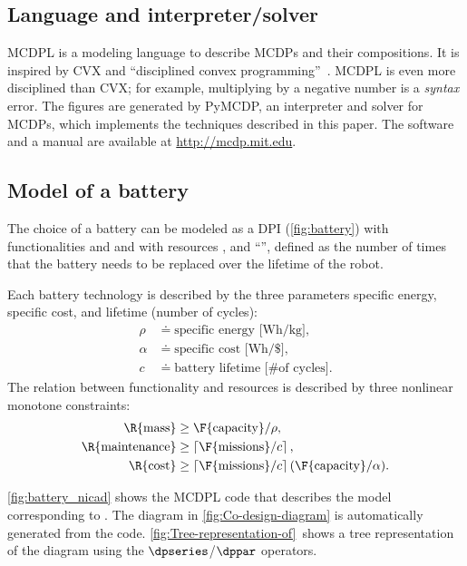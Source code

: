 \subsection{Language and interpreter/solver}

MCDPL is a modeling language to describe MCDPs and their compositions.
It is inspired by CVX and ``disciplined convex programming''~\cite{grant08graph}.
MCDPL is even more disciplined than CVX; for example, multiplying
by a negative number is a \emph{syntax} error. The figures are generated
by PyMCDP, an interpreter and solver for MCDPs, which implements the
techniques described in this paper. The software and a manual are
available at \url{http://mcdp.mit.edu}.

\subsection{Model of a battery}

The choice of a battery can be modeled as a DPI (\cref{fig:battery})
with functionalities  and 
and with resources ,  and ``'',
defined as the number of times that the battery needs to be replaced
over the lifetime of the robot.

Each battery technology is described by the three parameters specific
energy, specific cost, and lifetime (number of cycles):
\begin{align*}
    \rho & \doteq\text{specific energy [Wh/kg]},\\
    \alpha & \doteq\text{specific cost [Wh/\$]},\\
    c & \doteq\text{battery lifetime [\# of cycles]}.
\end{align*}
The relation between functionality and resources is described by three
nonlinear monotone constraints:
\begin{align}
    \R{\text{mass}} & \geq\F{\text{capacity}}/\rho,\label{eq:mass}\\
    \R{\text{maintenance}} & \geq\left\lceil \F{\text{missions}}/c\right\rceil ,\label{eq:maintenance}\\
    \R{\text{cost}} & \geq\left\lceil \F{\text{missions}}/c\right\rceil (\F{\text{capacity}}/\alpha).\label{eq:cost}
\end{align}

\cref{fig:battery_nicad} shows the MCDPL code that describes the
model corresponding to .
The diagram in \cref{fig:Co-design-diagram} is automatically generated
from the code. \cref{fig:Tree-representation-of}~shows a tree representation
of the diagram using the $\dpseries$/$\dppar$ operators.

